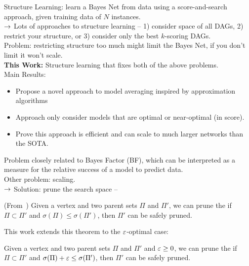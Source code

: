 Structure Learning: learn a Bayes Net from data using a score-and-search approach, given training data of $N$ instances. \\

$\rightarrow$ Lots of approaches to structure learning -- 1) consider space of all DAGs, 2) restrict your structure, or 3) consider only the best $k$-scoring DAGs.\\

Problem: restricting structure too much might limit the Bayes Net, if you don't limit it won't scale. \\

{\bf This Work:} Structure learning that fixes both of the above problems. \\

Main Results:
\begin{itemize}
    \item Propose a novel approach to model averaging inspired by approximation algorithms
    \item Approach only consider models that are optimal or near-optimal (in score).
    \item Prove this approach is efficient and can scale to much larger networks than the SOTA.
\end{itemize}


Problem closely related to Bayes Factor (BF), which can be interpreted as a measure for the relative success of a model to predict data. \\

Other problem: scaling. \\

$\rightarrow$ Solution: prune the search space --
\begin{theorem}
(From~\citet{teyssier2012ordering}) Given a vertex and two parent sets $\Pi$ and $\Pi'$, we can prune the if $\Pi \subset \Pi'$ and $\sigma(\Pi) \leq \sigma(\Pi')$, then $\Pi'$ can be safely pruned.
\end{theorem}

This work extends this theorem to the $\varepsilon$-optimal case:
\begin{theorem}
Given a vertex and two parent sets $\Pi$ and $\Pi'$ and $\varepsilon \geq 0$, we can prune the if $\Pi \subset \Pi'$ and $\sigma(\Pi) + \varepsilon \leq \sigma(\Pi')$, then $\Pi'$ can be safely pruned.
\end{theorem}

